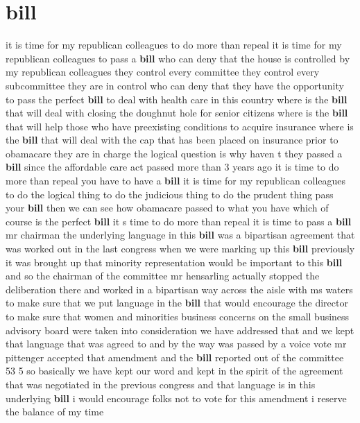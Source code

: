 \documentclass{article}
\begin{document}
\section*{bill}
it is time for my republican colleagues to do more than repeal it is time for my republican colleagues to pass a {\bf \color{red} bill} who can deny that the house is controlled by my republican colleagues they control every committee they control every subcommittee they are in control who can deny that they have the opportunity to pass the perfect {\bf \color{red} bill} to deal with health care in this country where is the {\bf \color{red} bill} that will deal with closing the doughnut hole for senior citizens where is the {\bf \color{red} bill} that will help those who have preexisting conditions to acquire insurance where is the {\bf \color{red} bill} that will deal with the cap that has been placed on insurance prior to obamacare they are in charge the logical question is why haven t they passed a {\bf \color{red} bill} since the affordable care act passed more than 3 years ago it is time to do more than repeal you have to have a {\bf \color{red} bill} it is time for my republican colleagues to do the logical thing to do the judicious thing to do the prudent thing pass your {\bf \color{red} bill} then we can see how obamacare passed to what you have which of course is the perfect {\bf \color{red} bill} it s time to do more than repeal it is time to pass a {\bf \color{red} bill}
\vspace{8mm}
mr chairman the underlying language in this {\bf \color{red} bill} was a bipartisan agreement that was worked out in the last congress when we were marking up this {\bf \color{red} bill} previously it was brought up that minority representation would be important to this {\bf \color{red} bill} and so the chairman of the committee mr hensarling actually stopped the deliberation there and worked in a bipartisan way across the aisle with ms waters to make sure that we put language in the {\bf \color{red} bill} that would encourage the director to make sure that women and minorities business concerns on the small business advisory board were taken into consideration we have addressed that and we kept that language that was agreed to and by the way was passed by a voice vote mr pittenger accepted that amendment and the {\bf \color{red} bill} reported out of the committee 53 5 so basically we have kept our word and kept in the spirit of the agreement that was negotiated in the previous congress and that language is in this underlying {\bf \color{red} bill} i would encourage folks not to vote for this amendment i reserve the balance of my time
\end{document}
